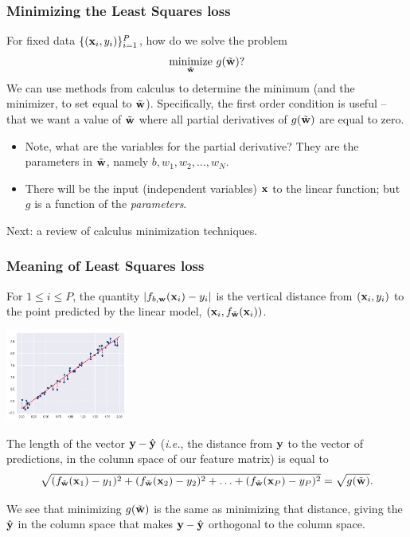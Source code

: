 \documentclass{beamer}
\theoremstyle{example}
\begin{document}
\begin{frame}
    \frametitle{Minimizing the Least Squares loss}
    For fixed data $\{({\bf x}_i, y_i)\}_{i=1}^P$, how do we solve the problem 
                \[\underset{\tilde{\bf w}}{\text{minimize}}\ g(\tilde{\bf w})?\]
    \pause
    We can use methods from calculus to determine the minimum (and the minimizer, to set equal to $\tilde{\bf w}$). Specifically, the first order condition is useful {--} that we want a value of $\tilde{\bf w}$ where all partial derivatives of $g(\tilde{\bf w})$ are equal to zero. 
    \begin{itemize}
        \pause
        \item Note, what are the variables for the partial derivative? They are the parameters in $\tilde{\bf w}$, namely $b,w_1,w_2,\ldots,w_N$.
        \pause
        \item There will be the input (independent variables) ${\bf x}$ to the linear function; but $g$ is a function of the \emph{parameters}.
    \end{itemize}
    \vfill
    \pause
    Next: a review of calculus minimization techniques.
\end{frame}

\begin{frame}
    \frametitle{Meaning of Least Squares loss}
    For $1\le i\le P$, the quantity $|f_{b,{\bf w}}({\bf x}_i) - y_i|$ is the vertical distance from $({\bf x}_i, y_i)$ to the point predicted by the linear model, $({\bf x}_i, f_{\tilde{\bf w}}({\bf x}_i))$. 
    
    \pause
    \begin{center} 
    \includegraphics[width=0.3\textwidth]{../../Images/lsr-error-lines.png}
    \end{center}

    \pause
    The length of the vector ${\bf y} - \hat{\bf y}$ (\textit{i.e.}, the distance from ${\bf y}$ to the vector of predictions, in the column space of our feature matrix) is equal to 
        \[\sqrt{(f_{\tilde{\bf w}}({\bf x}_1) - y_1)^2 + (f_{\tilde{\bf w}}({\bf x}_2) - y_2)^2 + \ldots + (f_{\tilde{\bf w}}({\bf x}_P) - y_P)^2} = \sqrt{g(\tilde{\bf w})}.\]

    \pause
    We see that minimizing $g(\tilde{\bf w})$ is the same as minimizing that distance, giving the $\hat{\bf y}$ in the column space that makes ${\bf y} - \hat{\bf y}$ orthogonal to the column space.
\end{frame}
\end{document}
